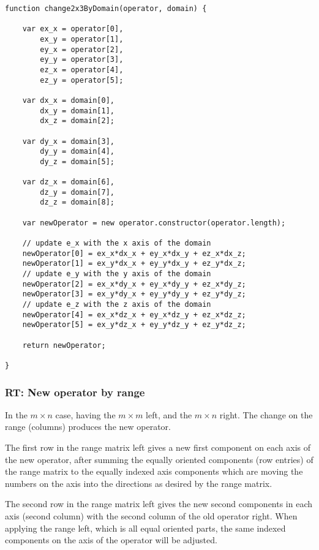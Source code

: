 \documentclass[a4paper]{article}
\begin{document}
\begin{lstlisting}
function change2x3ByDomain(operator, domain) {

    var ex_x = operator[0],
        ex_y = operator[1],
        ey_x = operator[2],
        ey_y = operator[3],
        ez_x = operator[4],
        ez_y = operator[5];
    
    var dx_x = domain[0], 
        dx_y = domain[1],
        dx_z = domain[2];
        
    var dy_x = domain[3], 
        dy_y = domain[4],
        dy_z = domain[5];
    
    var dz_x = domain[6], 
        dz_y = domain[7],
        dz_z = domain[8];
    
    var newOperator = new operator.constructor(operator.length);
    
    // update e_x with the x axis of the domain
    newOperator[0] = ex_x*dx_x + ey_x*dx_y + ez_x*dx_z;
    newOperator[1] = ex_y*dx_x + ey_y*dx_y + ez_y*dx_z;
    // update e_y with the y axis of the domain
    newOperator[2] = ex_x*dy_x + ey_x*dy_y + ez_x*dy_z;
    newOperator[3] = ex_y*dy_x + ey_y*dy_y + ez_y*dy_z;    
    // update e_z with the z axis of the domain
    newOperator[4] = ex_x*dz_x + ey_x*dz_y + ez_x*dz_z;
    newOperator[5] = ex_y*dz_x + ey_y*dz_y + ez_y*dz_z;
    
    return newOperator;

}
\end{lstlisting}
\subsubsection{RT: New operator by range}

In the $m \times n$ case, having the $m \times m$ left, and the $m \times n$ right. The change on the range (columns) produces the new operator.

The first row in the range matrix left gives a new first component on each axis of the new operator, after summing the equally oriented components (row entries) of the range matrix to the equally indexed axis components which are moving the numbers on the axis into the directions as desired by the range matrix.

The second row in the range matrix left gives the new second components in each axis (second column) with the second column of the old operator right. When applying the range left, which is all equal oriented parts, the same indexed components on the axis of the operator will be adjusted.
\end{document}
